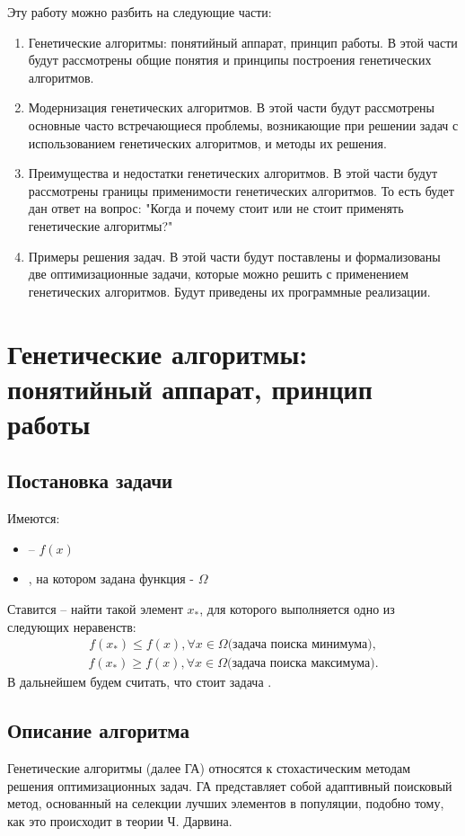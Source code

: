 Эту работу можно разбить на следующие части:
\begin{enumerate}
\item Генетические алгоритмы: понятийный аппарат, принцип работы. В этой части будут рассмотрены общие понятия и принципы построения генетических алгоритмов.
\item Модернизация генетических алгоритмов. В этой части будут рассмотрены основные часто встречающиеся проблемы, возникающие при решении задач с использованием генетических алгоритмов, и методы их решения.
\item Преимущества и недостатки генетических алгоритмов. В этой части будут рассмотрены границы применимости генетических алгоритмов. То есть будет дан ответ на вопрос: "Когда и почему стоит или не стоит применять генетические алгоритмы?"
\item Примеры решения задач. В этой части будут поставлены и формализованы две оптимизационные задачи, которые можно решить с применением генетических алгоритмов. Будут приведены их программные реализации.
\end{enumerate}

\chapter{Генетические алгоритмы: понятийный аппарат, принцип работы}
\section{Постановка задачи}
Имеются:
\begin{itemize}
\item {} --  $f(x)$
\item {}, на котором задана функция - $\Omega$
\end{itemize}
Ставится  -- найти такой элемент $x_{\ast}$, для которого выполняется одно из следующих неравенств:
\begin{eqnarray*}
f(x_{\ast}) \leq f(x), \forall x \in \Omega  \textrm{(задача поиска минимума)},
\end{eqnarray*}
\begin{eqnarray*}
f(x_{\ast}) \geq f(x), \forall x \in \Omega  \textrm{(задача поиска максимума)}.
\end{eqnarray*}
В дальнейшем будем считать, что стоит задача .

\section{Описание алгоритма}
Генетические алгоритмы (далее ГА) относятся к стохастическим методам решения оптимизационных задач. ГА представляет собой адаптивный поисковый метод, основанный на селекции лучших элементов в популяции, подобно тому, как это происходит в теории Ч. Дарвина.

